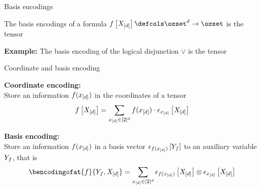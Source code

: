 \documentclass{beamer}
\begin{document}
    \begin{frame}{Basis encodings}
        \begin{definition}
            The basis encodings of a formula $\formulawith \defcols \ozset^{\catorder}\rightarrow \ozset$ is the tensor
            \begin{center}
                
            \end{center}
        \end{definition}

        \textbf{Example:}
        The basis encoding of the logical disjunction $\lor$ is the tensor
        \begin{center}
            
        \end{center}
    \end{frame}

    \begin{frame}{Coordinate and basis encoding}

        {\bf Coordinate encoding:} \\
        Store an information $f(x_{[d]})$ in the coordinates of a tensor
        \begin{align*}
            f\left[X_{[d]}\right]
            = \sum_{x_{[d]}\in[2]^{d}}f(x_{[d]}) \cdot \epsilon_{x_{[d]}}\left[X_{[d]}\right]
        \end{align*}

            {\bf Basis encoding:} \\
        Store an information $f(x_{[d]})$ in a basis vector $\epsilon_{f(x_{[d]})}\left[Y_{f}\right]$ to an auxiliary variable $Y_{f}$, that is
        \begin{align*}
            \bencodingofat{\formula}{\headvariableof{\formula},\shortcatvariables}
            = \sum_{\shortcatindices\in[2]^{\catorder}}  \onehotmapofat{\formulaev{\shortcatindices}}{\shortcatvariables} \otimes \onehotmapofat{\shortcatindices}{\shortcatvariables}
        \end{align*}

    \end{frame}
\end{document}
